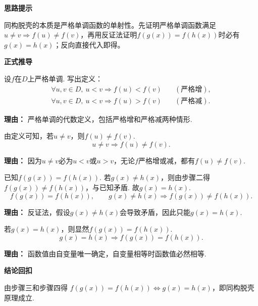 \begin{proofbox}
	\textbf{\textcolor{CProof}{思路提示}}

	同构脱壳的本质是严格单调函数的单射性。先证明严格单调函数满足$u\neq v\Rightarrow f(u)\neq f(v)$，再用反证法证明$f(g(x))=f(h(x))$时必有$g(x)=h(x)$；反向直接代入即得。

	\medskip
	\textbf{\textcolor{CProof}{正式推导}}
	\begin{description}[style=nextline, leftmargin=2.8em, labelsep=0.5em, itemsep=0.55em]
		\item[\textbf{步骤一（单调定义）：}] 设$f$在$D$上严格单调. 写出定义：
			\[
				\begin{aligned}
					\forall u,v\in D,\ u<v\Rightarrow f(u)<f(v) &\quad (\text{严格增}),\\
					\forall u,v\in D,\ u<v\Rightarrow f(u)>f(v) &\quad (\text{严格减}).
			\end{aligned}
			\]
			\par\textbf{理由：} 严格单调的代数定义，包括严格增和严格减两种情形.

		\item[\textbf{步骤二（单射性质）：}] 由定义可知，若$u\neq v$，则$f(u)\neq f(v)$.
			\[
				u\neq v \Longrightarrow f(u)\neq f(v).
			\]
			\par\textbf{理由：} 因为$u\neq v$必为$u<v$或$u>v$，无论$f$严格增或减，都有$f(u)\neq f(v)$.

		\item[\textbf{步骤三（正向推证）：}] 已知$f(g(x))=f(h(x))$. 若$g(x)\neq h(x)$，则由步骤二得$f(g(x))\neq f(h(x))$，与已知矛盾. 故$g(x)=h(x)$.
			\[
				f(g(x))=f(h(x)),
				\qquad
				g(x)\neq h(x)\Rightarrow f(g(x))\neq f(h(x)).
			\]
			\par\textbf{理由：} 反证法，假设$g(x)\neq h(x)$会导致矛盾，因此只能$g(x)=h(x)$.

		\item[\textbf{步骤四（反向验证）：}] 若$g(x)=h(x)$，则显然$f(g(x))=f(h(x))$.
			\[
				g(x)=h(x) \Longrightarrow f(g(x))=f(h(x)).
			\]
			\par\textbf{理由：} 函数值由自变量唯一确定，自变量相等时函数值必然相等.
	\end{description}

	\medskip
	\textbf{\textcolor{CProof}{结论回扣}}

	由步骤三和步骤四得 $f(g(x))=f(h(x))\iff g(x)=h(x)$，即同构脱壳原理成立.
\end{proofbox}

